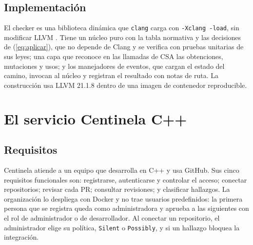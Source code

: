 \documentclass[conference]{IEEEtran}
\newcommand{\code}[1]{\texttt{#1}}
\begin{document}
\subsection{Implementación}
El checker es una biblioteca dinámica que \code{clang} carga con \code{-Xclang -load}, sin modificar LLVM \cite{lattner04}. Tiene un núcleo puro con la tabla normativa y las decisiones de (\ref{eq:aplicar}), que no depende de Clang y se verifica con pruebas unitarias de sus leyes; una capa que reconoce en las llamadas de CSA las obtenciones, mutaciones y usos; y los manejadores de eventos, que cargan el estado del camino, invocan al núcleo y registran el resultado con notas de ruta. La construcción usa LLVM 21.1.8 dentro de una imagen de contenedor reproducible.

\section{El servicio Centinela C++}

\subsection{Requisitos}
Centinela atiende a un equipo que desarrolla en C++ y usa GitHub. Sus cinco requisitos funcionales son: registrarse, autenticarse y controlar el acceso; conectar repositorios; revisar cada PR; consultar revisiones; y clasificar hallazgos. La organización lo despliega con Docker y no trae usuarios predefinidos: la primera persona que se registra queda como administradora y aprueba a las siguientes con el rol de administrador o de desarrollador. Al conectar un repositorio, el administrador elige su política, \code{Silent} o \code{Possibly}, y si un hallazgo bloquea la integración.
\end{document}
